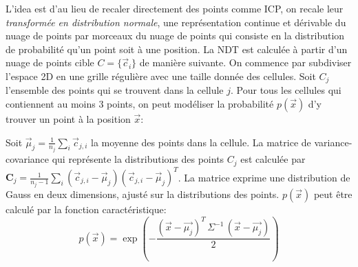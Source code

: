 \documentclass[a4paper,10pt]{scrreprt}
\begin{document}
L'idea est d'au lieu de recaler directement des points comme ICP, on recale leur \emph{transformée en distribution normale}, une représentation continue et dérivable du nuage de points par morceaux du nuage de points qui consiste en la distribution de probabilité qu'un point soit à une position. La NDT est calculée à partir d'un nuage de points cible $C = \{ \vec{c}_i \}$ de manière suivante. On commence par subdiviser l'espace 2D en une grille régulière avec une taille donnée des cellules. Soit $C_j$ l'ensemble des points qui se trouvent dans la cellule $j$. Pour tous les cellules qui contiennent au moins $3$ points, on peut modéliser la probabilité $p(\vec{x})$ d'y trouver un point à la position $\vec{x}$:
	
Soit $\vec{\mu}_j = \frac{1}{n_j} \sum_{i} \vec{c}_{j,i}$ la moyenne des points dans la cellule. La matrice de variance-covariance qui représente la distributions des points $C_j$ est calculée par $\mathbf{C}_j = \frac{1}{n_j - 1} \sum_i (\vec{c}_{j,i} - \vec{\mu}_j)(\vec{c}_{j,i} - \vec{\mu}_j)^T$. La matrice exprime une distribution de Gauss en deux dimensions, ajusté sur la distributions des points. $p(\vec{x})$ peut être calculé par la fonction caractéristique:
\begin{equation}
	p(\vec{x}) = \exp \left(- \frac{ (\vec{x} - \vec{\mu_j})^T \, \Sigma^{-1} \, (\vec{x} - \vec{\mu_j}) }{2} \right)
\end{equation}
\end{document}
